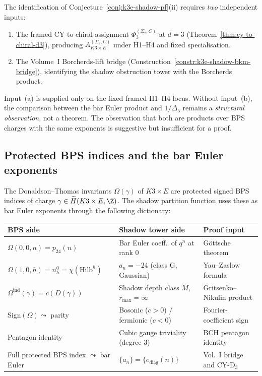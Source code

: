 \begin{remark}[Borcherds denominator \texorpdfstring{$\neq$}{!=} bar Euler product]
\label{rem:k3e-borcherds-bar}
The identification of Conjecture~\ref{conj:k3e-shadow-pf}(ii) requires \emph{two} independent inputs:
\begin{enumerate}[label=(\alph*)]
\item The framed CY-to-chiral assignment $\Phi_3^{(\Sigma_2,C)}$ at $d = 3$ (Theorem~\ref{thm:cy-to-chiral-d3}), producing $A_{K3 \times E}^{(\Sigma_2,C)}$ under H1--H4 and fixed specialisation.
\item The Volume~I Borcherds-lift bridge (Construction~\ref{constr:k3e-shadow-bkm-bridge}), identifying the shadow obstruction tower with the Borcherds product.
\end{enumerate}
Input~(a) is supplied only on the fixed framed H1--H4 locus. Without input~(b), the comparison between the bar Euler product and $1/\Delta_5$ remains a \emph{structural observation}, not a theorem. The observation that both are products over BPS charges with the same exponents is suggestive but insufficient for a proof.
\end{remark}

\subsection{Protected BPS indices and the bar Euler exponents}
\label{subsec:k3e-bps-exponents}

The Donaldson--Thomas invariants $\Omega(\gamma)$ of $K3 \times E$ are protected signed BPS indices of charge $\gamma \in \widetilde{H}(K3 \times E, \Z)$. The shadow partition function uses these as bar Euler exponents through the following dictionary:

\begin{center}
\renewcommand{\arraystretch}{1.3}
\begin{tabular}{@{}lll@{}}
\textbf{BPS side} & \textbf{Shadow tower side} & \textbf{Proof input} \\ \hline
$\Omega(0,0,n) = p_{24}(n)$ & Bar Euler coeff.\ of $q^n$ at rank $0$ & G\"ottsche theorem \\
$\Omega(1,0,h) = n_h^0 = \chi(\mathrm{Hilb}^h)$ & $a_n = -24$ (class G, Gaussian) & Yau--Zaslow formula \\
$\Omega^{\mathrm{ind}}(\gamma) = c(D(\gamma))$ & Shadow depth class $M$, $r_{\max} = \infty$ & Gritsenko--Nikulin product \\
Sign$(\Omega) \leadsto$ parity & Bosonic ($c > 0$) / fermionic ($c < 0$) & Fourier-coefficient sign \\
Pentagon identity & Cubic gauge triviality (degree $3$) & BCH pentagon identity \\
Full protected BPS index $\leadsto$ bar Euler & $\{a_n\} = \{e_{\mathrm{diag}}(n)\}$ & Vol.~I bridge and CY-D$_3$
\end{tabular}
\end{center}

